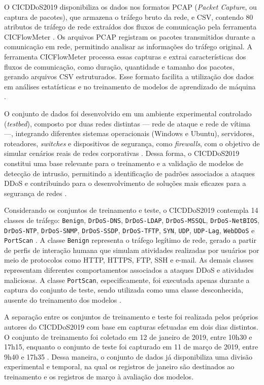 \documentclass[
    12pt,                %
    openright,           %
    oneside,             %
    a4paper,             %
    english,             %
    brazil               %
]{abntex2}
\begin{document}
O CICDDoS2019 disponibiliza os dados nos formatos PCAP (\textit{Packet Capture}, ou captura de pacotes), que armazena o tráfego bruto da rede, e CSV, contendo 80 atributos de tráfego de rede extraídos dos fluxos de comunicação pela ferramenta CICFlowMeter \cite{sharafaldin2019}. Os arquivos PCAP registram os pacotes transmitidos durante a comunicação em rede, permitindo analisar as informações do tráfego original. A ferramenta CICFlowMeter processa essas capturas e extrai características dos fluxos de comunicação, como duração, quantidade e tamanho dos pacotes, gerando arquivos CSV estruturados. Esse formato facilita a utilização dos dados em análises estatísticas e no treinamento de modelos de aprendizado de máquina \cite{sharafaldin2019}.

O conjunto de dados foi desenvolvido em um ambiente experimental controlado (\textit{testbed}), composto por duas redes distintas — rede de ataque e rede de vítima —, integrando diferentes sistemas operacionais (Windows e Ubuntu), servidores, roteadores, \textit{switches} e dispositivos de segurança, como \textit{firewalls}, com o objetivo de simular cenários reais de redes corporativas \cite{sharafaldin2019}. Dessa forma, o CICDDoS2019 constitui uma base relevante para o treinamento e a validação de modelos de detecção de intrusão, permitindo a identificação de padrões associados a ataques DDoS e contribuindo para o desenvolvimento de soluções mais eficazes para a segurança de redes \cite{sharafaldin2019}.

Considerando os conjuntos de treinamento e teste, o CICDDoS2019 contempla 14 classes de tráfego: \texttt{Benign}, \texttt{DrDoS-DNS}, \texttt{DrDoS-LDAP}, \texttt{DrDoS-MSSQL}, \texttt{DrDoS-NetBIOS}, \texttt{DrDoS-NTP}, \texttt{DrDoS-SNMP}, \texttt{DrDoS-SSDP}, \texttt{DrDoS-TFTP}, \texttt{SYN}, \texttt{UDP}, \texttt{UDP-Lag}, \texttt{WebDDoS} e \texttt{PortScan} \cite{sharafaldin2019}. A classe \texttt{Benign} representa o tráfego legítimo de rede, gerado a partir de perfis de interação humana que simulam atividades realizadas por usuários por meio de protocolos como HTTP, HTTPS, FTP, SSH e e-mail. As demais classes representam diferentes comportamentos associados a ataques DDoS e atividades maliciosas. A classe \texttt{PortScan}, especificamente, foi executada apenas durante a captura do conjunto de teste, sendo utilizada como uma classe desconhecida, ausente do treinamento dos modelos \cite{sharafaldin2019}.

A separação entre os conjuntos de treinamento e teste foi realizada pelos próprios autores do CICDDoS2019 com base em capturas efetuadas em dois dias distintos. O conjunto de treinamento foi coletado em 12 de janeiro de 2019, entre 10h30 e 17h15, enquanto o conjunto de teste foi capturado em 11 de março de 2019, entre 9h40 e 17h35 \cite{sharafaldin2019}. Dessa maneira, o conjunto de dados já disponibiliza uma divisão experimental e temporal, na qual os registros de janeiro são destinados ao treinamento e os registros de março à avaliação dos modelos.
\end{document}
